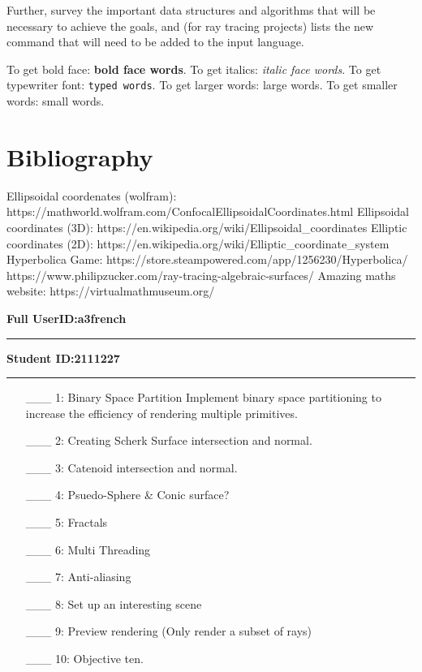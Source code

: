 \documentclass {article}
\begin{document}
     Further, survey the important data structures and algorithms that
     will be necessary to achieve the goals, and (for ray tracing
     projects) lists the new command
     that will need to be added to the input language.

     To  get  bold face: {\bf bold face words}.  To get italics: {\it italic
     face words}.  To  get typewriter font: {\tt typed words}.  To get
     larger  words:  {\large large  words}.   To  get smaller words: 
     {\small small words}.  

\section{Bibliography}
     Ellipsoidal coordenates (wolfram): https://mathworld.wolfram.com/ConfocalEllipsoidalCoordinates.html
     Ellipsoidal coordinates (3D): https://en.wikipedia.org/wiki/Ellipsoidal\_coordinates
     Elliptic coordinates (2D): https://en.wikipedia.org/wiki/Elliptic\_coordinate\_system
     Hyperbolica Game: https://store.steampowered.com/app/1256230/Hyperbolica/
     https://www.philipzucker.com/ray-tracing-algebraic-surfaces/
     Amazing maths website: https://virtualmathmuseum.org/

\newpage



{\hfill{\bf Full UserID:a3french\rule{2in}{.1mm}}\hfill{\bf Student ID:2111227\rule{2in}{.1mm}}\hfill}

\begin{enumerate}
     \item[\_\_\_ 1:]  Binary Space Partition
          Implement binary space partitioning to increase the efficiency of rendering multiple primitives.

     \item[\_\_\_ 2:]  Creating Scherk Surface intersection and normal.
          


     \item[\_\_\_ 3:]  Catenoid intersection and normal.

     \item[\_\_\_ 4:]  Psuedo-Sphere & Conic surface?

     \item[\_\_\_ 5:]  Fractals

     \item[\_\_\_ 6:]  Multi Threading

     \item[\_\_\_ 7:]  Anti-aliasing

     \item[\_\_\_ 8:]  Set up an interesting scene

     \item[\_\_\_ 9:]  Preview rendering (Only render a subset of rays)

     \item[\_\_\_ 10:]  Objective ten.
\end{enumerate}

\end{document}
